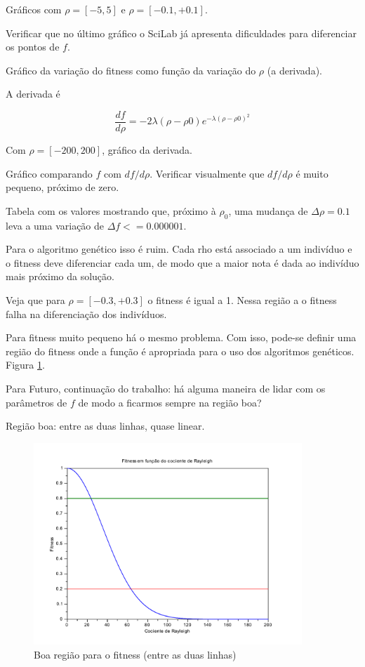 	
	Gráficos com $\rho = [-5,5]$ e $\rho = [-0.1,+0.1]$.
	
	Verificar que no último gráfico o SciLab já apresenta dificuldades para diferenciar os pontos de $f$.
	
	Gráfico da variação do fitness como função da variação do $\rho$ (a derivada).
	
	A derivada é 
	
	$$
		\frac{df}{d\rho} = -2\lambda(\rho - \rho0)e^{-\lambda(\rho - \rho0)^2}
	$$
	
	Com $\rho = [-200,200]$, gráfico da derivada.
	
	Gráfico comparando $f$ com $df/d\rho$. Verificar visualmente que $df/d\rho$ é muito pequeno, próximo de zero. 
	
	Tabela com os valores mostrando que, próximo à $\rho_0$, uma mudança de $\Delta\rho = 0.1$ leva a uma variação de $\Delta f <= 0.000001$.
	
	Para o algoritmo genético isso é ruim. Cada rho está associado a um indivíduo e o fitness deve diferenciar cada um, de modo que a maior nota é dada ao indivíduo mais próximo da solução.
	
	Veja que para $\rho = [-0.3,+0.3]$ o fitness é igual a 1. Nessa região a o fitness falha na diferenciação dos indivíduos.
	
	Para fitness muito pequeno há o mesmo problema. Com isso, pode-se definir uma região do fitness onde a função é apropriada para o uso dos algoritmos genéticos. Figura \ref{fig:fitness_boaRegiao}.
	
	Para Futuro, continuação do trabalho: há alguma maneira de lidar com os parâmetros de $f$ de modo a ficarmos sempre na região boa?
	
	Região boa: entre as duas linhas, quase linear.
		
	\begin{figure}[htbp]
		\centering
			\includegraphics[width=0.90\textwidth]{figs/resultados/fitness_boaRegiao.pdf}
		\caption{Boa região para o fitness (entre as duas linhas)}
		\label{fig:fitness_boaRegiao}
	\end{figure}
	
